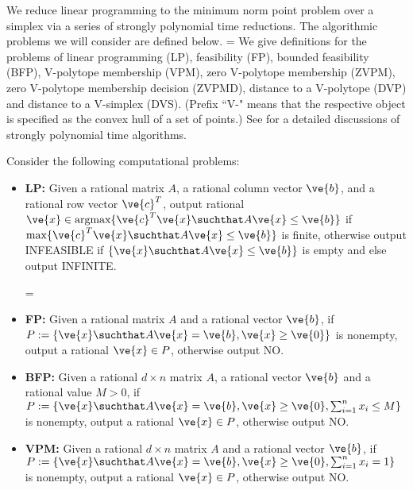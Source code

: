 
We reduce linear programming to the minimum norm point problem over a simplex via a series of strongly polynomial time reductions.  
The algorithmic problems we will consider are defined below.  
\ifnum\version=\stocversion
\else
We give definitions for the problems of linear programming (LP), feasibility (FP), bounded feasibility (BFP), V-polytope membership (VPM), zero V-polytope membership (ZVPM), zero V-polytope membership decision (ZVPMD), distance to a V-polytope (DVP) and distance to a V-simplex (DVS). (Prefix ``V-" means that the respective object is specified as the convex hull of a set of points.) See \cite{schrijver98, lovasz1988geometric, MR1956924} for a detailed discussions of strongly polynomial time algorithms.
\fi

\begin{definition}
Consider the following computational problems:
\begin{itemize}
\item 
\textbf{\textup{LP:}} 
Given a rational matrix $A$, a rational column vector $\ve{b}$, and a rational row vector $\ve{c}^T$, output rational $\ve{x} \in \text{argmax}\{\ve{c}^T\ve{x} \suchthat A\ve{x} \le \ve{b}\}$ if $\max\{\ve{c}^T\ve{x} \suchthat A\ve{x} \le \ve{b}\}$ is finite, otherwise output INFEASIBLE if $\{\ve{x} \suchthat A\ve{x} \le \ve{b}\}$ is empty and else output INFINITE.

\ifnum\version=\stocversion
\else

\item 
\textbf{\textup{FP:}} 
Given a rational matrix $A$ and a rational vector $\ve{b}$, if $P:= \{\ve{x} \suchthat A\ve{x} = \ve{b}, \ve{x} \ge \ve{0}\}$ is nonempty, output a rational $\ve{x} \in P$, otherwise output NO.

\item
\textbf{\textup{BFP:}} 
Given a rational $d \times n$ matrix $A$, a rational vector $\ve{b}$ and a rational value $M > 0$, if $P:= \{\ve{x} \suchthat A\ve{x} = \ve{b}, \ve{x} \ge \ve{0}, \sum_{i=1}^n x_i \le M\}$ is nonempty, output a rational $\ve{x} \in P$, otherwise output NO.

\item
\textbf{\textup{VPM:}} 
Given a rational $d \times n$ matrix $A$ and a rational vector $\ve{b}$, if $P:=\{\ve{x} \suchthat A\ve{x}=\ve{b}, \ve{x} \ge \ve{0}, \sum_{i=1}^n x_i = 1\}$ is nonempty, output a rational $\ve{x} \in P$, otherwise output NO.


\end{itemize}
\end{definition}
